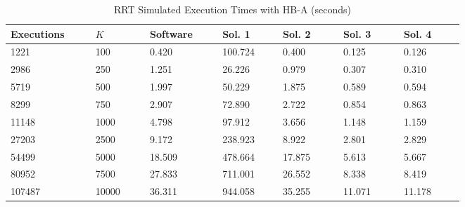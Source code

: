 \begin{table}[H]
\begin{center}
\begin{tabular}{|m{0.14\linewidth}|m{0.09\linewidth}|m{0.12\linewidth}|m{0.1\linewidth}|m{0.1\linewidth}|m{0.1\linewidth}|m{0.1\linewidth}|}
\hline
\textbf{Executions} & \textbf{$K$} & \textbf{Software} & \textbf{Sol. 1} & \textbf{Sol. 2} & \textbf{Sol. 3} & \textbf{Sol. 4}\\
\hline
1221 & 100 & 0.420 & 100.724 & 0.400 & 0.125 & 0.126 \\
2986 & 250 & 1.251 & 26.226 & 0.979 & 0.307 & 0.310 \\
5719 & 500 & 1.997 & 50.229 & 1.875 & 0.589 & 0.594 \\
8299 & 750 & 2.907 & 72.890 & 2.722 & 0.854 & 0.863 \\
11148 & 1000 & 4.798 & 97.912 & 3.656 & 1.148 & 1.159 \\
27203 & 2500 & 9.172 & 238.923 & 8.922 & 2.801 & 2.829 \\
54499 & 5000 & 18.509 & 478.664 & 17.875 & 5.613 & 5.667 \\
80952 & 7500 & 27.833 & 711.001 & 26.552 & 8.338 & 8.419 \\
107487 & 10000 & 36.311 & 944.058 & 35.255 & 11.071 & 11.178 \\
\hline
\end{tabular}
\caption{RRT Simulated Execution Times with HB-A (seconds)}
\label{table:rrt-with-hba}
\end{center}
\end{table}